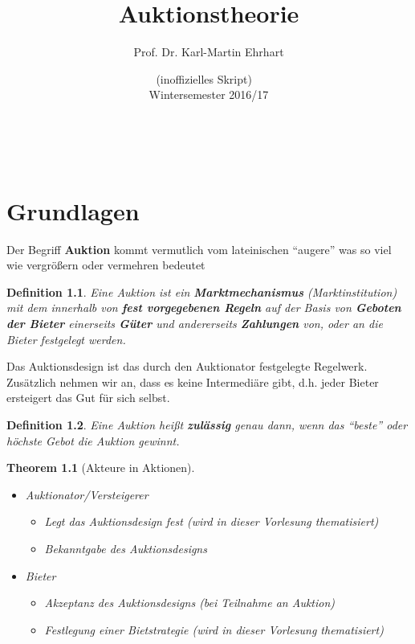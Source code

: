 \documentclass[12pt]{extreport} %
\title{Auktionstheorie}
\author{Prof. Dr. Karl-Martin Ehrhart}
\date{(inoffizielles Skript) ~\vspace{0.2cm} \\ Wintersemester 2016/17}
\makeatletter
\theoremstyle{named}
\newtheorem*{unnamedtheorem*}{Theorem}
\theoremstyle{itshape}
\newtheorem*{definition}{Definition}
\theoremstyle{normal}
\def\maketitle{ \begin{titlepage} 
			~\vspace{3cm} 
		\begin{center} {\Huge \@title} \end{center} 
	 		\vspace*{1cm} 
	 	\begin{center} {\large \@author} \end{center} 
	 	\begin{center} \@date \end{center} 
	 		\vspace*{7cm} 
	 	\begin{center} \@publishers \end{center} 
	 		\vfill 
	\end{titlepage} }
\makeatother
\begin{document}
\begin{titlepage}
	\maketitle
	\thispagestyle{empty}
\end{titlepage}
	
\tableofcontents
\thispagestyle{empty} 
  
\chapter{Grundlagen}

Der Begriff \textbf{Auktion} kommt vermutlich vom lateinischen \enquote{augere} was so viel wie vergrößern oder vermehren bedeutet

\begin{definition}
	Eine Auktion ist ein \textbf{Marktmechanismus} (Marktinstitution) mit dem innerhalb von \textbf{fest vorgegebenen Regeln} auf der Basis von \textbf{Geboten der Bieter} einerseits \textbf{Güter} und andererseits \textbf{Zahlungen} von, oder an die Bieter festgelegt werden.
\end{definition}

Das Auktionsdesign ist das durch den Auktionator festgelegte Regelwerk. Zusätzlich nehmen wir an, dass es keine Intermediäre gibt, d.h. jeder Bieter ersteigert das Gut für sich selbst.

 
\begin{definition}
	Eine Auktion heißt \textbf{zulässig} genau dann, wenn das \enquote{beste} oder höchste Gebot die Auktion gewinnt.
\end{definition}

 
\begin{unnamedtheorem*}[Akteure in Aktionen] ~\
	\begin{itemize}
		\item Auktionator/Versteigerer
			\begin{itemize}
				\item Legt das Auktionsdesign fest (wird in dieser Vorlesung thematisiert)
				\item Bekanntgabe des Auktionsdesigns
			\end{itemize}
		\item Bieter
			\begin{itemize}
				\item Akzeptanz des Auktionsdesigns (bei Teilnahme an Auktion)
				\item Festlegung einer Bietstrategie (wird in dieser Vorlesung thematisiert)
			\end{itemize}
	\end{itemize} 
\end{unnamedtheorem*}
\end{document}
